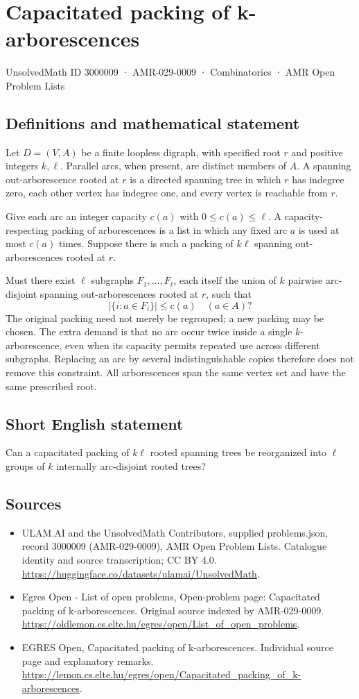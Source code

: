 \documentclass[11pt,a4paper]{article}
\begin{document}
\section*{Capacitated packing of k-arborescences}\label{3000009}
{\small UnsolvedMath ID 3000009 · AMR-029-0009 · Combinatorics · AMR Open Problem Lists}
\subsection{Definitions and mathematical statement}
Let $D=(V,A)$ be a finite loopless digraph, with specified root $r$ and
positive integers $k,\ell$. Parallel arcs, when present, are distinct
members of $A$. A spanning out-arborescence rooted at $r$ is a directed
spanning tree in which $r$ has indegree zero, each other vertex has
indegree one, and every vertex is reachable from $r$.

Give each arc an integer capacity $c(a)$ with $0\le c(a)\le\ell$.
A capacity-respecting packing of arborescences is a list in which any
fixed arc $a$ is used at most $c(a)$ times. Suppose there is such a
packing of $k\ell$ spanning out-arborescences rooted at $r$.

Must there exist $\ell$ subgraphs $F_1,\ldots,F_\ell$, each itself the
union of $k$ pairwise arc-disjoint spanning out-arborescences rooted at
$r$, such that
\[
                         |\{i:a\in F_i\}|\le c(a)
                                     \quad(a\in A)?
\]
The original packing need not merely be regrouped; a new packing may
be chosen. The extra demand is that no arc occur twice inside a single
$k$-arborescence, even when its capacity permits repeated use across
different subgraphs. Replacing an arc by several indistinguishable copies
therefore does not remove this constraint. All arborescences span the
same vertex set and have the same prescribed root.
\subsection{Short English statement}
Can a capacitated packing of $k\ell$ rooted spanning trees be
reorganized into $\ell$ groups of $k$ internally arc-disjoint rooted trees?
\subsection{Sources}
\begin{itemize}
\item[S1] ULAM.AI and the UnsolvedMath Contributors, supplied problems.json, record 3000009 (AMR-029-0009), AMR Open Problem Lists. Catalogue identity and source transcription; CC BY 4.0.
\url{https://huggingface.co/datasets/ulamai/UnsolvedMath}.
\item[S2] Egres Open - List of open problems, Open-problem page: Capacitated packing of k-arborescences. Original source indexed by AMR-029-0009.
\url{https://oldlemon.cs.elte.hu/egres/open/List_of_open_problems}.
\item[S3] EGRES Open, Capacitated packing of k-arborescences. Individual source page and explanatory remarks.
\url{https://lemon.cs.elte.hu/egres/open/Capacitated_packing_of_k-arborescences}.
\end{itemize}
\end{document}
